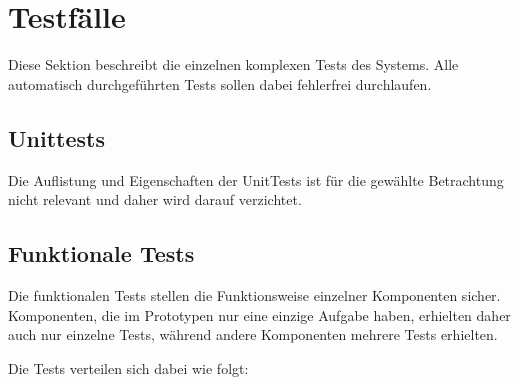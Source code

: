\section{Testfälle}
\label{sec:eval:testcases}

Diese Sektion beschreibt die einzelnen komplexen Tests des Systems.
Alle automatisch durchgeführten Tests sollen dabei fehlerfrei durchlaufen.

\subsection{Unittests}

Die Auflistung und Eigenschaften der UnitTests
ist für die gewählte Betrachtung nicht relevant und
daher wird darauf verzichtet.

\subsection{Funktionale Tests}
Die funktionalen Tests stellen die Funktionsweise einzelner Komponenten sicher.
Komponenten, die im Prototypen nur eine einzige Aufgabe haben,
erhielten daher auch nur einzelne Tests, während andere Komponenten mehrere Tests erhielten.

Die Tests verteilen sich dabei wie folgt:

